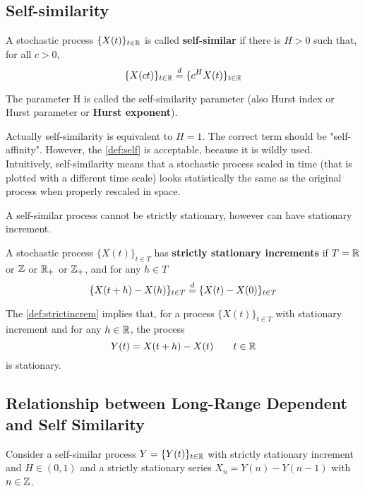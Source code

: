 \subsection{Self-similarity}

\begin{definition}\label{def:self}
	A stochastic process $\{ X(t) \}_{t \in \mathbb{R}}$ is called \textbf{self-similar} if there is $H > 0$ such that, for all $c > 0$,
	\begin{equation*}
		\{ X(ct) \}_{t \in \mathbb{R}} \overset{d}{=} \{ c^H X(t) \}_{t \in \mathbb{R}}
	\end{equation*}
	
	The parameter H is called the self-similarity parameter (also Hurst index or Hurst parameter or \textbf{Hurst exponent}).
\end{definition}

Actually self-similarity is equivalent to $H = 1$. The correct term should be "self-affinity". However, the \autoref{def:self} is acceptable, because it is wildly used. \\
Intuitively, self-similarity means that a stochastic process scaled in time (that is plotted with a different time scale) looks statistically the same as the original process when properly rescaled in space. 

A self-similar process cannot be strictly stationary, however can have stationary increment.

\begin{definition}\label{def:strictincrem}
	A stochastic process $\{X (t)\}_{t \in T}$ has \textbf{strictly stationary increments} if $T = \mathbb{R}$ or $\mathbb{Z}$ or $\mathbb{R}_+$ or $\mathbb{Z}_+$, and for any $h \in T$
	\begin{equation*}
		\{X(t+h) - X(h)\}_{t \in T} \overset{d}{=} \{X(t) - X(0) \}_{t \in T} 
	\end{equation*}
\end{definition}

The \autoref{def:strictincrem} implies that, for a process $\{X (t)\}_{t \in T}$ with stationary increment and for any $h \in \mathbb{R}$, the process
\begin{equation*}
	Y(t) = X(t+h) - X(t) \qquad t \in \mathbb{R}
\end{equation*}
is stationary.


\subsection{Relationship between Long-Range Dependent and Self Similarity}
Consider a self-similar process $Y = \{ Y(t )\}_{t \in \mathbb{R}}$ with strictly stationary increment and $H \in (0, 1)$ and a strictly stationary series $X_n = Y(n) - Y(n-1)$ with $n \in \mathbb{Z}$.

